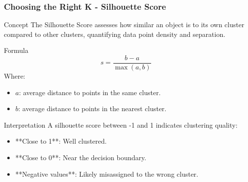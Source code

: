 \documentclass[aspectratio=169]{beamer}
\begin{document}
\begin{frame}[fragile]
    \frametitle{Choosing the Right K - Silhouette Score}
    \begin{block}{Concept}
        The Silhouette Score assesses how similar an object is to its own cluster compared to other clusters, quantifying data point density and separation.
    \end{block}
    
    \begin{block}{Formula}
        \begin{equation}
            s = \frac{b - a}{\max(a, b)}
        \end{equation}
        Where:
        \begin{itemize}
            \item \( a \): average distance to points in the same cluster.
            \item \( b \): average distance to points in the nearest cluster.
        \end{itemize}
    \end{block}
    
    \begin{block}{Interpretation}
        A silhouette score between -1 and 1 indicates clustering quality:
        \begin{itemize}
            \item **Close to 1**: Well clustered.
            \item **Close to 0**: Near the decision boundary.
            \item **Negative values**: Likely misassigned to the wrong cluster.
        \end{itemize}
    \end{block}
\end{frame}
\end{document}

